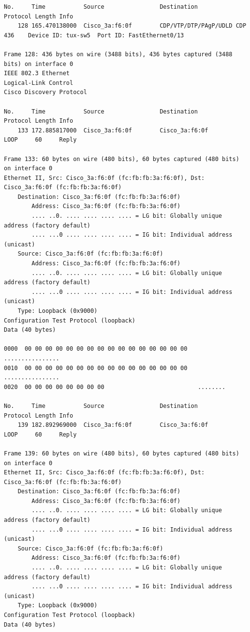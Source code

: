 \documentclass[a4paper,11pt]{article}
\begin{document}
\begin{lstlisting}
No.     Time           Source                Destination           Protocol Length Info
    128 165.470138000  Cisco_3a:f6:0f        CDP/VTP/DTP/PAgP/UDLD CDP      436    Device ID: tux-sw5  Port ID: FastEthernet0/13  

Frame 128: 436 bytes on wire (3488 bits), 436 bytes captured (3488 bits) on interface 0
IEEE 802.3 Ethernet 
Logical-Link Control
Cisco Discovery Protocol

No.     Time           Source                Destination           Protocol Length Info
    133 172.885817000  Cisco_3a:f6:0f        Cisco_3a:f6:0f        LOOP     60     Reply

Frame 133: 60 bytes on wire (480 bits), 60 bytes captured (480 bits) on interface 0
Ethernet II, Src: Cisco_3a:f6:0f (fc:fb:fb:3a:f6:0f), Dst: Cisco_3a:f6:0f (fc:fb:fb:3a:f6:0f)
    Destination: Cisco_3a:f6:0f (fc:fb:fb:3a:f6:0f)
        Address: Cisco_3a:f6:0f (fc:fb:fb:3a:f6:0f)
        .... ..0. .... .... .... .... = LG bit: Globally unique address (factory default)
        .... ...0 .... .... .... .... = IG bit: Individual address (unicast)
    Source: Cisco_3a:f6:0f (fc:fb:fb:3a:f6:0f)
        Address: Cisco_3a:f6:0f (fc:fb:fb:3a:f6:0f)
        .... ..0. .... .... .... .... = LG bit: Globally unique address (factory default)
        .... ...0 .... .... .... .... = IG bit: Individual address (unicast)
    Type: Loopback (0x9000)
Configuration Test Protocol (loopback)
Data (40 bytes)

0000  00 00 00 00 00 00 00 00 00 00 00 00 00 00 00 00   ................
0010  00 00 00 00 00 00 00 00 00 00 00 00 00 00 00 00   ................
0020  00 00 00 00 00 00 00 00                           ........

No.     Time           Source                Destination           Protocol Length Info
    139 182.892969000  Cisco_3a:f6:0f        Cisco_3a:f6:0f        LOOP     60     Reply

Frame 139: 60 bytes on wire (480 bits), 60 bytes captured (480 bits) on interface 0
Ethernet II, Src: Cisco_3a:f6:0f (fc:fb:fb:3a:f6:0f), Dst: Cisco_3a:f6:0f (fc:fb:fb:3a:f6:0f)
    Destination: Cisco_3a:f6:0f (fc:fb:fb:3a:f6:0f)
        Address: Cisco_3a:f6:0f (fc:fb:fb:3a:f6:0f)
        .... ..0. .... .... .... .... = LG bit: Globally unique address (factory default)
        .... ...0 .... .... .... .... = IG bit: Individual address (unicast)
    Source: Cisco_3a:f6:0f (fc:fb:fb:3a:f6:0f)
        Address: Cisco_3a:f6:0f (fc:fb:fb:3a:f6:0f)
        .... ..0. .... .... .... .... = LG bit: Globally unique address (factory default)
        .... ...0 .... .... .... .... = IG bit: Individual address (unicast)
    Type: Loopback (0x9000)
Configuration Test Protocol (loopback)
Data (40 bytes)


\end{lstlisting}
\end{document}
